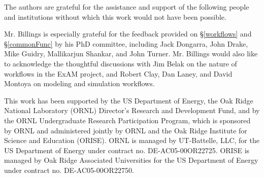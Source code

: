 \begin{acks}

The authors are grateful for the assistance and
support of the following people and institutions without which this work would
not have been possible.

Mr. Billings is especially grateful for the feedback provided on
\S\ref{workflows} and \S\ref{commonFunc} by his PhD committee, including Jack
Dongarra, John Drake, Mike Guidry, Mallikarjun Shankar, and John Turner. Mr.
Billings would also like to acknowledge the thoughtful discussions with Jim
Belak on the nature of workflows in the ExAM project, and Robert Clay, Dan
Laney, and David Montoya on modeling and simulation workflows.

This work has been supported by the US Department of Energy, the Oak Ridge
National Laboratory (ORNL) Director's Research and Development Fund, and by the
ORNL Undergraduate Research Participation Program, which is sponsored by ORNL
and administered jointly by ORNL and the Oak Ridge Institute for Science and
Education (ORISE). ORNL is managed by UT-Battelle, LLC, for the US Department
of Energy under contract no. DE-AC05-00OR22725. ORISE is managed by Oak Ridge
Associated Universities for the US Department of Energy under contract no.
DE-AC05-00OR22750.

\end{acks}